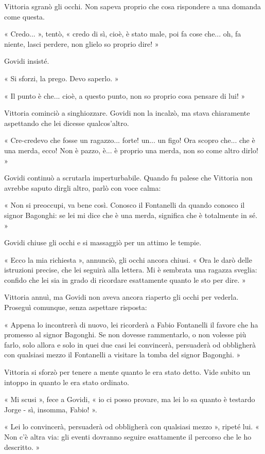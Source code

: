 Vittoria sgranò gli occhi. Non sapeva proprio che cosa rispondere a una domanda come questa.

« Credo... », tentò, « credo di sì, cioè, è stato male, poi fa cose che... oh, fa niente, lasci perdere, non glielo so proprio dire! »

Govidi insisté.

« Si sforzi, la prego. Devo saperlo. »

« Il punto è che... cioè, a questo punto, non so proprio cosa pensare di lui! »

Vittoria cominciò a singhiozzare. Govidi non la incalzò, ma stava chiaramente aspettando che lei dicesse qualcos'altro.

« Cre-credevo che fosse un ragazzo... forte! un... un figo! Ora scopro che... che è una merda, ecco! Non è pazzo, è... è proprio una merda, non so come altro dirlo! »

Govidi continuò a scrutarla imperturbabile. Quando fu palese che Vittoria non avrebbe saputo dirgli altro, parlò con voce calma:

« Non si preoccupi, va bene così. Conosco il Fontanelli da quando conosco il signor Bagonghi: se lei mi dice che è una merda, significa che è totalmente in sé. »

Govidi chiuse gli occhi e si massaggiò per un attimo le tempie.

« Ecco la mia richiesta », annunciò, gli occhi ancora chiusi. « Ora le darò delle istruzioni precise, che lei seguirà alla lettera. Mi è sembrata una ragazza sveglia: confido che lei sia in grado di ricordare esattamente quanto le sto per dire. »

Vittoria annuì, ma Govidi non aveva ancora riaperto gli occhi per vederla. Proseguì comunque, senza aspettare risposta:

« Appena lo incontrerà di nuovo, lei ricorderà a Fabio Fontanelli il favore che ha promesso al signor Bagonghi. Se non dovesse rammentarlo, o non volesse più farlo, solo allora e solo in quei due casi lei convincerà, persuaderà od obbligherà con qualsiasi mezzo il Fontanelli a visitare la tomba del signor Bagonghi. »

Vittoria si sforzò per tenere a mente quanto le era stato detto. Vide subito un intoppo in quanto le era stato ordinato.

« Mi scusi », fece a Govidi, « io ci posso provare, ma lei lo sa quanto è testardo Jorge - sì, insomma, Fabio! ».

« Lei  lo convincerà, persuaderà od obbligherà con qualsiasi mezzo », ripeté lui. « Non c'è altra via: gli eventi dovranno seguire esattamente il percorso che le ho descritto. »

